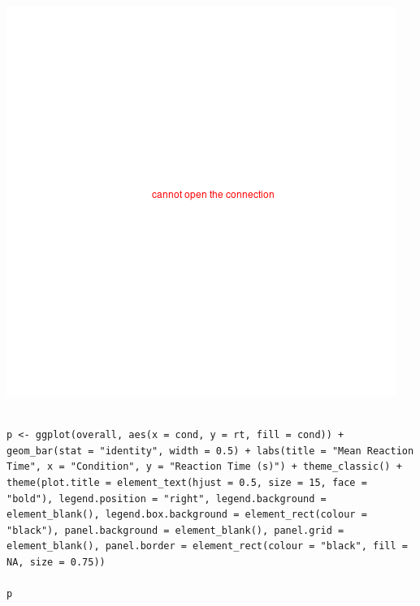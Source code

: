 \documentclass{article}
\begin{document}
\begin{center}
\includegraphics[width=.9\linewidth]{converted_stroop1.png}
\end{center}





\begin{verbatim}

p <- ggplot(overall, aes(x = cond, y = rt, fill = cond)) + geom_bar(stat = "identity", width = 0.5) + labs(title = "Mean Reaction Time", x = "Condition", y = "Reaction Time (s)") + theme_classic() + theme(plot.title = element_text(hjust = 0.5, size = 15, face = "bold"), legend.position = "right", legend.background = element_blank(), legend.box.background = element_rect(colour = "black"), panel.background = element_blank(), panel.grid = element_blank(), panel.border = element_rect(colour = "black", fill = NA, size = 0.75))

p

\end{verbatim}
\end{document}
